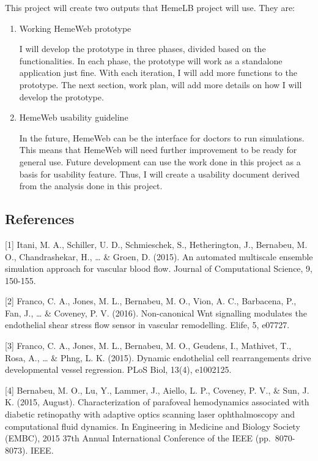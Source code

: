 \documentclass[]{article}
\begin{document}
This project will create two outputs that HemeLB project will use. They
are:

\begin{enumerate}
\def\labelenumi{\arabic{enumi}.}
\item
  Working HemeWeb prototype

  I will develop the prototype in three phases, divided based on the
  functionalities. In each phase, the prototype will work as a
  standalone application just fine. With each iteration, I will add more
  functions to the prototype. The next section, work plan, will add more
  details on how I will develop the prototype.
\item
  HemeWeb usability guideline

  In the future, HemeWeb can be the interface for doctors to run
  simulations. This means that HemeWeb will need further improvement to
  be ready for general use. Future development can use the work done in
  this project as a basis for usability feature. Thus, I will create a
  usability document derived from the analysis done in this project.
\end{enumerate}

\subsection{References}\label{references}

{[}1{]} Itani, M. A., Schiller, U. D., Schmieschek, S., Hetherington,
J., Bernabeu, M. O., Chandrashekar, H., \ldots{} \& Groen, D. (2015). An
automated multiscale ensemble simulation approach for vascular blood
flow. Journal of Computational Science, 9, 150-155.

{[}2{]} Franco, C. A., Jones, M. L., Bernabeu, M. O., Vion, A. C.,
Barbacena, P., Fan, J., \ldots{} \& Coveney, P. V. (2016). Non-canonical
Wnt signalling modulates the endothelial shear stress flow sensor in
vascular remodelling. Elife, 5, e07727.

{[}3{]} Franco, C. A., Jones, M. L., Bernabeu, M. O., Geudens, I.,
Mathivet, T., Rosa, A., \ldots{} \& Phng, L. K. (2015). Dynamic
endothelial cell rearrangements drive developmental vessel regression.
PLoS Biol, 13(4), e1002125.

{[}4{]} Bernabeu, M. O., Lu, Y., Lammer, J., Aiello, L. P., Coveney, P.
V., \& Sun, J. K. (2015, August). Characterization of parafoveal
hemodynamics associated with diabetic retinopathy with adaptive optics
scanning laser ophthalmoscopy and computational fluid dynamics. In
Engineering in Medicine and Biology Society (EMBC), 2015 37th Annual
International Conference of the IEEE (pp.~8070-8073). IEEE.
\end{document}
